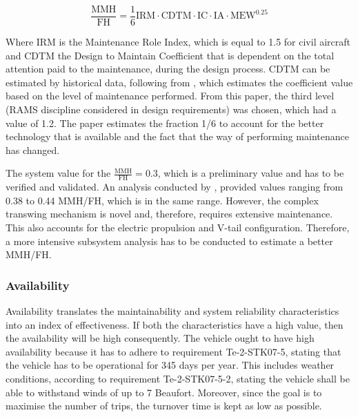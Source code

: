 \begin{equation}
    \label{eq:MMHFH}
    \frac{\text{MMH}}{\text{FH}} = \frac{1}{6} \text{IRM} \cdot \text{CDTM} \cdot \text{IC} \cdot \text{IA} \cdot \text{MEW}^{0.25}
\end{equation}

Where IRM is the Maintenance Role Index, which is equal to 1.5 for civil aircraft and CDTM the Design to Maintain Coefficient that is dependent on the total attention paid to the maintenance, during the design process.
CDTM can be estimated by historical data, following from \textcite{giovingo2019rams}, which estimates the coefficient value based on the level of maintenance performed.
From this paper, the third level (RAMS discipline considered in design requirements) was chosen, which had a value of 1.2. The paper estimates the fraction 1/6 to account for the better technology that is available and the fact that the way of performing maintenance has changed.

The system value for the $\frac{\text{MMH}}{\text{FH}}= 0.3$, which is a preliminary value and has to be verified and validated.
An analysis conducted by \textcite{sieb2023identifying}, provided values ranging from 0.38 to 0.44 MMH/FH, which is in the same range.
However, the complex transwing mechanism is novel and, therefore, requires extensive maintenance.
This also accounts for the electric propulsion and V-tail configuration.
Therefore, a more intensive subsystem analysis has to be conducted to estimate a better MMH/FH.

\subsubsection{Availability}
Availability translates the maintainability and system reliability characteristics into an index of effectiveness.
If both the characteristics have a high value, then the availability will be high consequently.
The vehicle ought to have high availability because it has to adhere to requirement Te-2-STK07-5, stating that the vehicle has to be operational for 345 days per year.
This includes weather conditions, according to requirement Te-2-STK07-5-2, stating the vehicle shall be able to withstand winds of up to 7 Beaufort.
Moreover, since the goal is to maximise the number of trips, the turnover time is kept as low as possible.